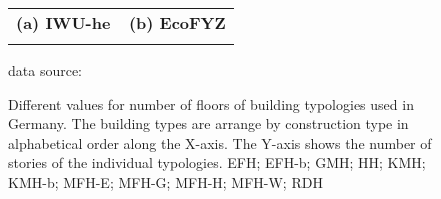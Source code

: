 \begin{figure}[htb]
\centering

  \begin{tabular}{p{0.5\linewidth} p{0.5\linewidth} }

\textbf{(a) IWU-he}&
\textbf{(b) EcoFYZ}
\\

&
\\
  \end{tabular}

\begin{flushright}
\footnotesize{data source:~\cite{Born.2003,Hermelink.2011}}
\end{flushright}
	\caption[Different values for number of floors of building typologies used in
	Germany.]{Different values for number of floors of building typologies used in
	Germany.
	The building types are arrange by construction type in alphabetical order along
	the X-axis.
	The Y-axis shows the number of stories of the individual typologies.
	EFH; EFH-b; GMH; HH; KMH; KMH-b; MFH-E; MFH-G; MFH-H; MFH-W; RDH}
	\label{fig:DifTypFloor}
\end{figure}
